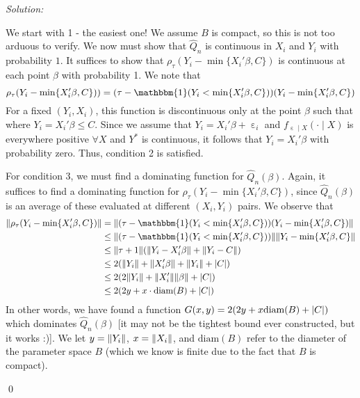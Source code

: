 \documentclass[12pt]{article}
\DeclarePairedDelimiter\norm{\lVert}{\rVert}%
\DeclareMathOperator{\eps}{\varepsilon}
\DeclarePairedDelimiter\abs{\lvert}{\rvert}%
\newenvironment{sol}
    {\emph{Solution:}
    }
    {
    \qed
    }
\begin{document}
\begin{sol}
\begin{enumerate}[label=\alph*) ]
    We start with 1 - the easiest one! We assume $B$ is compact, so this is not too arduous to verify. We now must show that $\hat{Q}_n$ is continuous in $X_i$ and $Y_i$ with probability $1$. It suffices to show that $\rho_{\tau}(Y_i - \min\{X_i'\beta, C\})$ is continuous at each point $\beta$ with probability 1. We note that
    \[\rho_{\tau}(Y_i - \min\{X_i'\beta, C\})) = (\tau - \mathbbm{1}(Y_i < \min\{X_i'\beta, C\}))(Y_i - \min\{X_i'\beta, C\})\]
    For a fixed $(Y_i, X_i)$, this function is discontinuous only at the point $\beta$ such that where $Y_i = X_i'\beta \leq C$. Since we assume that $Y_i = X_i'\beta + \eps_i$ and $f_{\eps \mid X}(\cdot\mid X)$ is everywhere positive $\forall X$ and $Y^*$ is continuous, it follows that $Y_i = X_i'\beta$ with probability zero. Thus, condition 2 is satisfied.

    For condition 3, we must find a dominating function for $\hat{Q}_n(\beta)$. Again, it suffices to find a dominating function for $\rho_{\tau}(Y_i - \min\{X_i'\beta, C\})$, since $\hat{Q}_n(\beta)$ is an average of these evaluated at different $(X_i, Y_i)$ pairs. We observe that
    \begin{align*}
        \norm{ \rho_{\tau}(Y_i - \min\{X_i'\beta, C\})} &= \norm{(\tau - \mathbbm{1}(Y_i < \min\{X_i'\beta, C\}))(Y_i - \min\{X_i'\beta, C\})}\\
        &\leq \norm{(\tau - \mathbbm{1}(Y_i < \min\{X_i'\beta, C\}))} \norm{Y_i - \min\{X_i'\beta, C\}} \\
        &\leq \norm{\tau + 1}(\norm{Y_i - X_i'\beta} + \norm{Y_i - C})\\
        &\leq 2 (\norm{Y_i} + \norm{X_i ' \beta} + \norm{Y_i} + \abs{C})\\
        &\leq 2 (2 \norm{Y_i} + \norm{X_i'} \norm{\beta} + \abs{C})\\
        &\leq 2 (2 y + x \cdot \text{diam}(B) + \abs{C})
    \end{align*}
    In other words, we have found a function $G(x,y) = 2(2 y + x \text{diam}(B) + \abs{C})$ which dominates $\hat{Q}_n(\beta)$ [it may not be the tightest bound ever constructed, but it works :)]. We let $y = \norm{Y_i}$, $x = \norm{X_i}$, and $\text{diam}(B)$ refer to the diameter of the parameter space $B$ (which we know is finite due to the fact that $B$ is compact). 


\end{enumerate}
\end{sol}
\end{document}
